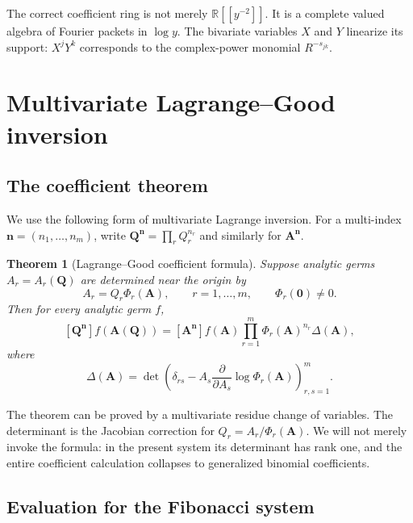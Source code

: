 \documentclass[11pt,oneside]{article}
\numberwithin{equation}{section}
\theoremstyle{plain}
\newtheorem{theorem}{Theorem}[section]
\theoremstyle{definition}
\theoremstyle{remark}
\newcommand{\multi}[1]{\bm{#1}}
\newcommand{\R}{\mathbb R}
\begin{document}
\begin{summarybox}
The correct coefficient ring is not merely \(\R[[y^{-2}]]\).  It is a
complete valued algebra of Fourier packets in \(\log y\).  The bivariate
variables \(X\) and \(Y\) linearize its support: \(X^jY^k\) corresponds to
the complex-power monomial \(R^{-s_{jk}}\).
\end{summarybox}
\section{Multivariate Lagrange--Good inversion}\label{sec:good}

\subsection{The coefficient theorem}

We use the following form of multivariate Lagrange inversion.  For a
multi-index \(\multi n=(n_1,\ldots,n_m)\), write
\(
 \multi Q^{\multi n}=\prod_r Q_r^{n_r}
\) and similarly for \(\multi A^{\multi n}\).

\begin{theorem}[Lagrange--Good coefficient formula]\label{thm:good}
Suppose analytic germs \(A_r=A_r(\multi Q)\) are determined near the origin
by
\begin{equation}\label{eq:Good-system}
 A_r=Q_r\Phi_r(\multi A),
 \qquad r=1,\ldots,m,
 \qquad \Phi_r(\multi0)\ne0.
\end{equation}
Then for every analytic germ \(f\),
\begin{equation}\label{eq:Good-formula}
 [\multi Q^{\multi n}]f(\multi A(\multi Q))
 = [\multi A^{\multi n}]
 f(\multi A)\prod_{r=1}^m\Phi_r(\multi A)^{n_r}
 \Delta(\multi A),
\end{equation}
where
\begin{equation}\label{eq:Good-determinant}
 \Delta(\multi A)=
 \det\!\left(
   \delta_{rs}-A_s\frac{\partial}{\partial A_s}
                   \log\Phi_r(\multi A)
 \right)_{r,s=1}^m.
\end{equation}
\end{theorem}

The theorem can be proved by a multivariate residue change of variables.
The determinant is the Jacobian correction for
\(Q_r=A_r/\Phi_r(\multi A)\).  We will not merely invoke the formula: in the
present system its determinant has rank one, and the entire coefficient
calculation collapses to generalized binomial coefficients.

\subsection{Evaluation for the Fibonacci system}
\end{document}
